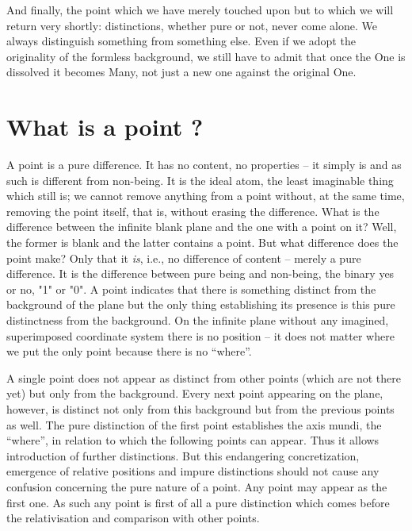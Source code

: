 And finally, the point which we have merely touched upon but to which we will return very shortly: distinctions, whether pure or not, never come alone. We always distinguish something from something else. Even if we adopt the originality of the formless background, we still have to admit that once the One is dissolved it becomes Many, not just a new one against the original One.

\section{What is a point ?}\label{se:point}
A point is a pure difference.
It has no content, no properties -- it simply is and as such is different from non-being. It is the ideal atom, the least imaginable thing which still is; we cannot remove anything from a point without, at the same time, removing the point itself, that is, without erasing the difference. What is the difference between the infinite blank plane and the one with a point on it? Well, the former is blank and the latter contains a point. But what difference does the point make? Only that it {\em is}, i.e., no difference of content -- merely a pure difference. It is the difference between pure being and non-being, the binary yes or no, "1" or "0". A point indicates that there is something distinct from the background of the plane but the only thing establishing its presence is this pure distinctness from the background. On the infinite plane without any imagined, superimposed coordinate system there is no position -- it does not matter where we put the only point because there is no ``where''.

A single point does not appear as distinct from other points (which are not there yet) but only from the background. Every next point appearing on the plane, however, is distinct not only from this background but from the previous points as well. The pure distinction of the first point establishes the axis mundi, the ``where'', in relation to which the following points can appear. Thus it allows introduction of further distinctions. But this endangering concretization, emergence of relative positions and impure distinctions should not cause any confusion concerning the pure nature of a point. Any point may appear as the first one. As such any point is first of all a pure distinction which comes before the relativisation and comparison with other points.

